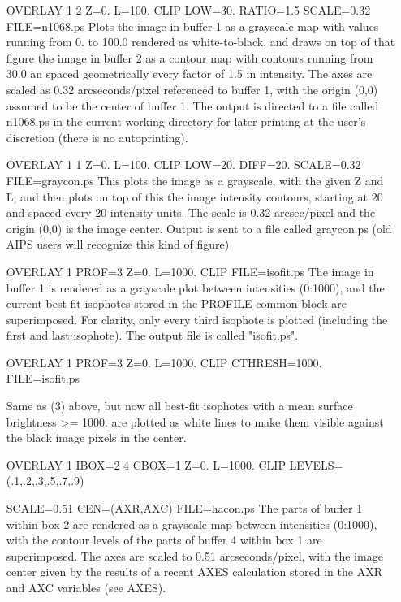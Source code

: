 \begin{itemize}
  \item[OVERLAY 1 2 Z=0. L=100. CLIP LOW=30. RATIO=1.5 SCALE=0.32 FILE=n1068.ps\hfill]{
   Plots the image in buffer 1 as a grayscale map with values running from
   0. to 100.0 rendered as white-to-black, and draws on top of that figure
   the image in buffer 2 as a contour map with contours running from 30.0
   an spaced geometrically every factor of 1.5 in intensity.  The axes
   are scaled as 0.32 arcseconds/pixel referenced to buffer 1, with the
   origin (0,0) assumed to be the center of buffer 1.  The output is
   directed to a file called n1068.ps in the current working directory
   for later printing at the user's discretion (there is no autoprinting).}
  \item[OVERLAY 1 1 Z=0. L=100. CLIP LOW=20. DIFF=20. SCALE=0.32 FILE=graycon.ps\hfill]{
   This plots the image as a grayscale, with the given Z and L, and then
   plots on top of this the image intensity contours, starting at 20 and
   spaced every 20 intensity units.  The scale is 0.32 arcsec/pixel and
   the origin (0,0) is the image center.  Output is sent to a file
   called graycon.ps  (old AIPS users will recognize this kind of figure)}
  \item[OVERLAY 1 PROF=3 Z=0. L=1000. CLIP FILE=isofit.ps\hfill]{
   The image in buffer 1 is rendered as a grayscale plot between
   intensities (0:1000), and the current best-fit isophotes stored in
   the PROFILE common block are superimposed.  For clarity, only every 
   third isophote is  plotted (including the first and last isophote).
   The output file is called "isofit.ps".}
  \item[OVERLAY 1 PROF=3 Z=0. L=1000. CLIP CTHRESH=1000. FILE=isofit.ps\hfill]{}
  \item[\hfill]{Same as (3) above, but now all best-fit isophotes with a mean
   surface brightness >= 1000. are plotted as white lines to make
   them visible against the black image pixels in the center.}
  \item[OVERLAY 1 IBOX=2 4 CBOX=1 Z=0. L=1000. 
        CLIP LEVELS=(.1,.2,.3,.5,.7,.9)\hfill]{}
  \item[SCALE=0.51 CEN=(AXR,AXC) FILE=hacon.ps\hfill]{
   The parts of buffer 1 within box 2 are rendered as a grayscale map
   between intensities (0:1000), with the contour levels of the parts
   of buffer 4 within box 1 are superimposed.  The axes are scaled to 0.51
   arcseconds/pixel, with the image center given by the results of a recent
   AXES calculation stored in the AXR and AXC variables (see AXES).}

\end{itemize}
